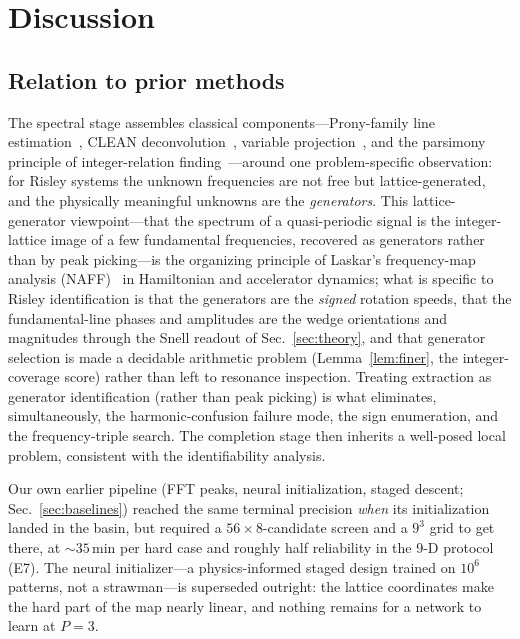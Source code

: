 \documentclass[twocolumn,preprintnumbers,amsmath,amssymb,pra,floatfix]{revtex4-2}
\begin{document}
\section{Discussion}
\label{sec:discussion}

\subsection{Relation to prior methods}

The spectral stage assembles classical components---Prony-family line
estimation~\cite{HuaSarkar1990,RoyKailath1989}, CLEAN
deconvolution~\cite{Hogbom1974}, variable
projection~\cite{GolubPereyra1973}, and the parsimony principle of
integer-relation finding~\cite{LLL1982}---around one problem-specific
observation: for Risley systems the unknown frequencies are not free
but lattice-generated, and the physically meaningful unknowns are the
\emph{generators}.  This lattice-generator viewpoint---that the spectrum
of a quasi-periodic signal is the integer-lattice image of a few
fundamental frequencies, recovered as generators rather than by peak
picking---is the organizing principle of Laskar's frequency-map analysis
(NAFF)~\cite{Laskar1990,Laskar1993} in Hamiltonian and accelerator
dynamics; what is specific to Risley identification is that the
generators are the \emph{signed} rotation speeds, that the
fundamental-line phases and amplitudes are the wedge orientations and
magnitudes through the Snell readout of Sec.~\ref{sec:theory}, and that
generator selection is made a decidable arithmetic problem
(Lemma~\ref{lem:finer}, the integer-coverage score) rather than left to
resonance inspection.  Treating extraction as generator identification
(rather than peak picking) is what eliminates, simultaneously, the
harmonic-confusion failure mode, the sign enumeration, and the
frequency-triple search.  The completion stage then inherits a
well-posed local problem, consistent with the identifiability analysis.

Our own earlier pipeline (FFT peaks, neural initialization, staged
descent; Sec.~\ref{sec:baselines}) reached the same terminal precision
\emph{when} its initialization landed in the basin, but required a
$56\times8$-candidate screen and a $9^3$ grid to get there, at
$\sim\!35$\,min per hard case and roughly half reliability in the 9-D
protocol (E7).  The neural initializer---a physics-informed staged design
trained on $10^{6}$ patterns, not a strawman---is superseded outright:
the lattice coordinates make the hard part of the map nearly linear,
and nothing remains for a network to learn at $P{=}3$.
\end{document}
